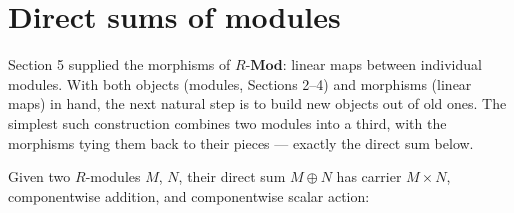 \section{Direct sums of modules}\label{sec:10-modules:06-direct-sums:1}

Section 5 supplied the morphisms of \(R\text{-}\mathbf{Mod}\): linear maps between individual modules. With both objects (modules, Sections 2--4) and morphisms (linear maps) in hand, the next natural step is to build new objects out of old ones. The simplest such construction combines two modules into a third, with the morphisms tying them back to their pieces --- exactly the direct sum below.

Given two \(R\)-modules \(M\), \(N\), their direct sum \(M \oplus N\) has carrier \(M \times N\), componentwise addition, and componentwise scalar action:

